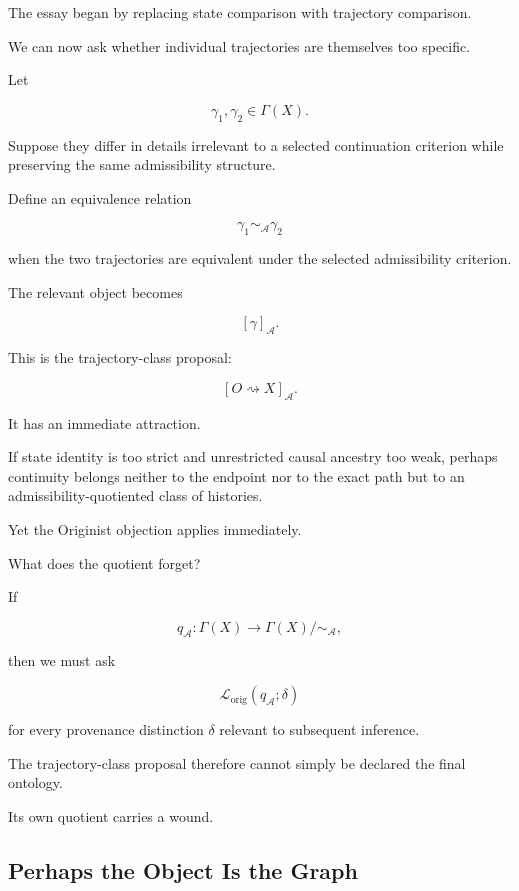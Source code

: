 \documentclass[
  11pt,
  a4paper,
  DIV=12,
  BCOR=0mm,
  parskip=half-
]{scrartcl}
\newcommand{\Adm}{\mathcal A}
\newcommand{\lossorig}{%
  \mathscr L_{\mathrm{orig}}%
}
\newcommand{\leadsto}{\rightsquigarrow}
\theoremstyle{definition}
\theoremstyle{plain}
\theoremstyle{remark}
\begin{document}
The essay began by replacing state comparison with trajectory comparison.

We can now ask whether individual trajectories are themselves too specific.

Let

\[
  \gamma_1,\gamma_2\in\Gamma(X).
\]

Suppose they differ in details irrelevant to a selected continuation criterion
while preserving the same admissibility structure.

Define an equivalence relation

\[
  \gamma_1\sim_{\Adm}\gamma_2
\]

when the two trajectories are equivalent under the selected admissibility
criterion.

The relevant object becomes

\[
  [\gamma]_{\Adm}.
\]

This is the trajectory-class proposal:

\[
  [O\leadsto X]_{\Adm}.
\]

It has an immediate attraction.

If state identity is too strict and unrestricted causal ancestry too weak,
perhaps continuity belongs neither to the endpoint nor to the exact path but
to an admissibility-quotiented class of histories.

Yet the Originist objection applies immediately.

What does the quotient forget?

If

\[
  q_{\Adm}:
  \Gamma(X)
  \rightarrow
  \Gamma(X)/{\sim_{\Adm}},
\]

then we must ask

\[
  \lossorig(q_{\Adm};\delta)
\]

for every provenance distinction \(\delta\) relevant to subsequent inference.

The trajectory-class proposal therefore cannot simply be declared the final
ontology.

Its own quotient carries a wound.


\subsection{Perhaps the Object Is the Graph}
\label{sec:perhaps-graph}
\end{document}
